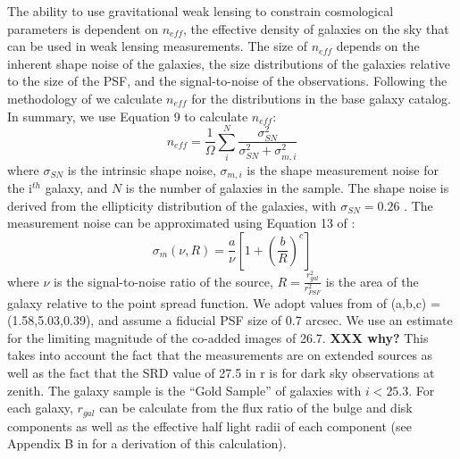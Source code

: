 \documentclass[]{article}
\begin{document}
The ability to use gravitational weak lensing to constrain
cosmological parameters is dependent on $n_{eff}$, the effective
density of galaxies on the sky that can be used in weak lensing
measurements. The size of $n_{eff}$ depends on the inherent shape
noise of the galaxies, the size distributions of the galaxies relative
to the size of the PSF, and the signal-to-noise of the observations.
Following the methodology of \citet{chang} we calculate $n_{eff}$ for
the distributions in the base galaxy catalog.  In summary, we use
Equation 9 to calculate $n_{eff}$:
\begin{equation}
n_{eff} = \frac{1}{\Omega}\sum^N_i\frac{\sigma^2_{SN}}{\sigma^2_{SN}+\sigma^2_{m,i}}
\end{equation}
where $\sigma_{SN}$ is the intrinsic shape noise, $\sigma_{m,i}$ is
the shape measurement noise for the i$^{th}$ galaxy, and $N$ is the
number of galaxies in the sample. The shape noise is derived from the
ellipticity distribution of the galaxies, with $\sigma_{SN} = 0.26$
\citep{chang}.  The measurement noise can be approximated using
Equation 13 of \citet{chang}:
\begin{equation}
\sigma_m(\nu,R) = \frac{a}{\nu}\left[1+\left(\frac{b}{R}\right)^c\right]
\end{equation}
where $\nu$ is the signal-to-noise ratio of the source,
$R=\frac{r_{gal}^2}{r_{PSF}^2}$ is the area of the galaxy relative to
the point spread function.  We adopt values from \citet{chang} of
(a,b,c) = (1.58,5.03,0.39), and assume a fiducial PSF size of 0.7
arcsec. We use an estimate for the limiting magnitude of the co-added
images of 26.7.  {\bf XXX why?} This takes into account the fact that
the measurements are on extended sources as well as the fact that the
SRD value of 27.5 in r is for dark sky observations at zenith.  The
galaxy sample is the ``Gold Sample'' of galaxies with $i < 25.3$.  For
each galaxy, $r_{gal}$ can be calculate from the flux ratio of the
bulge and disk components as well as the effective half light radii of
each component (see Appendix B in \citet{chang} for a derivation of
this calculation).
\end{document}
